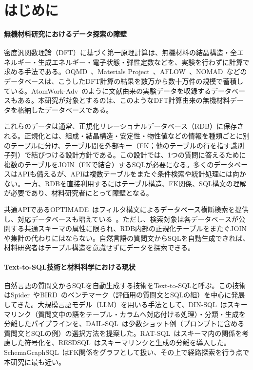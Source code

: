 \documentclass[twocolumn]{interact}
\begin{document}
\section{はじめに}
\label{sec:introduction}

\paragraph*{無機材料研究におけるデータ探索の障壁}

密度汎関数理論（DFT）に基づく第一原理計算は、無機材料の結晶構造・全エネルギー・生成エネルギー・電子状態・弾性定数などを、実験を行わずに計算で求める手法である。OQMD~\cite{saal2013oqmd,kirklin2015oqmd}、Materials Project~\cite{jain2013mp}、AFLOW~\cite{curtarolo2012aflow}、NOMAD~\cite{draxl2019nomad}などのデータベースは、こうしたDFT計算の結果を数万から数十万件の規模で蓄積している。AtomWork-Adv~\cite{nims2018atomworkadv}のように文献由来の実験データを収録するデータベースもある。本研究が対象とするのは、このようなDFT計算由来の無機材料データを格納したデータベースである。

これらのデータは通常、正規化リレーショナルデータベース（RDB）に保存される。正規化とは、組成・結晶構造・安定性・物性値などの情報を種類ごとに別のテーブルに分け、テーブル間を外部キー（FK；他のテーブルの行を指す識別子列）で結びつける設計方針である。この設計では、1つの質問に答えるために複数のテーブルをJOIN（FKで結合）するSQLが必要になる。多くのデータベースはAPIも備えるが、APIは複数テーブルをまたぐ条件検索や統計処理には向かない。一方、RDBを直接利用するにはテーブル構造、FK関係、SQL構文の理解が必要であり、材料研究者にとって障壁となる。

共通APIであるOPTIMADE~\cite{andersen2021optimade}はフィルタ構文によるデータベース横断検索を提供し、対応データベースも増えている~\cite{evans2024optimade}。ただし、検索対象は各データベースが公開する共通スキーマの属性に限られ、RDB内部の正規化テーブルをまたぐJOINや集計の代わりにはならない。自然言語の質問文からSQLを自動生成できれば、材料研究者はテーブル構造を意識せずにデータを探索できる。

\paragraph*{Text-to-SQL技術と材料科学における現状}

自然言語の質問文からSQLを自動生成する技術をText-to-SQLと呼ぶ。この技術はSpider~\cite{yu2018spider}やBIRD~\cite{li2024bird}のベンチマーク（評価用の質問文とSQLの組）を中心に発展してきた。大規模言語モデル（LLM）を用いる手法として、DIN-SQL~\cite{pourreza2024dinsql}はスキーマリンク（質問文中の語をテーブル・カラムへ対応付ける処理）・分類・生成を分離したパイプラインを、DAIL-SQL~\cite{gao2023dail}は少数ショット例（プロンプトに含める質問文とSQLの例）の選択方法を提案した。RAT-SQL~\cite{wang2020ratsql}はスキーマ内の関係を考慮した符号化を、RESDSQL~\cite{li2023resdsql}はスキーマリンクと生成の分離を導入した。SchemaGraphSQL~\cite{safdarian2026schemagraphsql}はFK関係をグラフとして扱い、その上で経路探索を行う点で本研究に最も近い。
\end{document}
